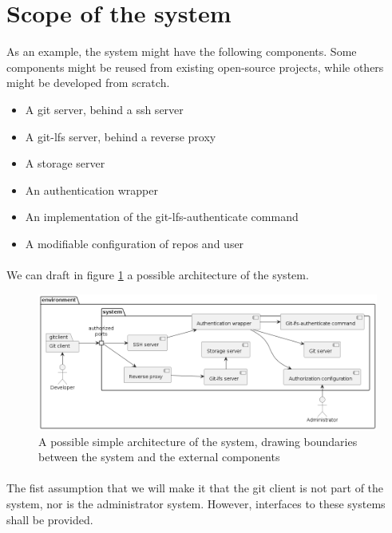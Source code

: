 \newpage
\section{Scope of the system}

As an example, the system might have the following components. Some components might be reused from existing open-source projects, while others might be developed from scratch.

\begin{itemize}
    \item A git server, behind a ssh server
    \item A git-lfs server, behind a reverse proxy
    \item A storage server
    \item An authentication wrapper
    \item An implementation of the git-lfs-authenticate command
    \item A modifiable configuration of repos and user
\end{itemize}

\paragraph{}
We can draft in figure \ref{fig:architecture} a possible architecture of the system.

\begin{figure}[h]
    \centering
    \includegraphics[width=\textwidth]{design/diagrams/context.png}
    \caption{A possible simple architecture of the system, drawing boundaries between the system and the external components}
    \label{fig:architecture}
\end{figure}

\paragraph{}
The fist assumption that we will make it that the git client is not part of the system, nor is the administrator system. However, interfaces to these systems shall be provided.

